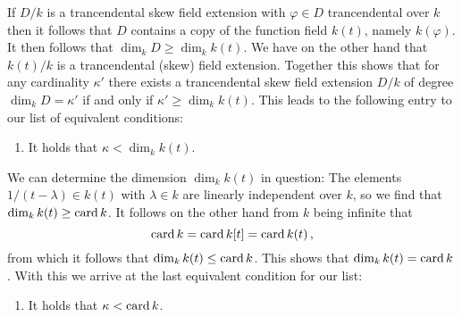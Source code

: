 \begin{remark}
  If $D/k$ is a trancendental skew field extension with $\varphi \in D$ trancendental over $k$ then it follows that $D$ contains a copy of the function field $k(t)$, namely $k(\varphi)$.
  It then follows that $\dim_k D \geq \dim_k k(t)$.
  We have on the other hand that $k(t)/k$ is a trancendental (skew) field extension.
  Together this shows that for any cardinality $\kappa'$ there exists a trancendental skew field extension $D/k$ of degree $\dim_k D = \kappa'$ if and only if $\kappa' \geq \dim_k k(t)$.
  This leads to the following entry to our list of equivalent conditions:
  \begin{enumerate}[resume]
    \item 
     It holds that $\kappa < \dim_k k(t)$.
  \end{enumerate}
  
  We can determine the dimension $\dim_k k(t)$ in question:
  The elements $1/(t - \lambda) \in k(t)$ with $\lambda \in k$ are linearly independent over $k$, so we find that $\dim_k k(t) \geq \operatorname{card} k$.
  It follows on the other hand from $k$ being infinite that
  \[
      \operatorname{card} k
    = \operatorname{card} k[t]
    = \operatorname{card} k(t) \,,
  \]
  from which it follows that $\dim_k k(t) \leq \operatorname{card} k$.
  This shows that $\dim_k k(t) = \operatorname{card} k$.
  With this we arrive at the last equivalent condition for our list:
  \begin{enumerate}[resume]
    \item
      It holds that $\kappa < \operatorname{card} k$.
  \end{enumerate}
  

\end{remark}
